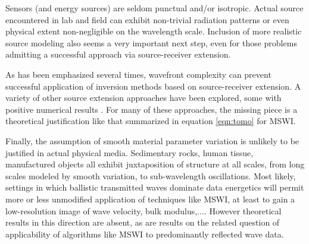 Sensors (and energy sources) are seldom punctual and/or
isotropic. Actual source encountered in lab and field can exhibit
non-trivial radiation patterns or even physical extent non-negligible
on the wavelength scale. Inclusion of more realistic source modeling
also seems a very important next step, even for those problems
admitting a successful approach via source-receiver extension.

As has been emphasized several times, wavefront complexity can prevent
successful application of inversion methods based on source-receiver
extension. A variety of other source extension approaches have been
explored, some with positive numerical results
\cite[]{HuangNammourSymesDollizal:SEG19}. For many of these
approaches, the missing piece is a theoretical justification like that
summarized in equation \ref{eqn:tomo} for MSWI.

Finally, the assumption of smooth material parameter variation is
unlikely to be justified in actual physical media. Sedimentary rocks,
human tissue, manufactured objects all exhibit juxtaposition of
structure at all scales, from long scales modeled by smooth variation,
to sub-wavelength oscillations. Most likely, settings in which
ballistic transmitted waves dominate data energetics will permit more
or less unmodified application of techniques like MSWI, at least to
gain a low-resolution image of wave velocity, bulk modulus,.... However
theoretical results in this direction are absent, as are results on
the related question of applicability of algorithms like MSWI to
predominantly reflected wave data.





